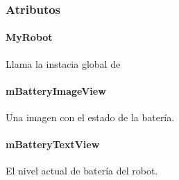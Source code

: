 \subsubsection{Atributos}
\label{\detokenize{dev_docs:id11}}

\paragraph{MyRobot}
\label{\detokenize{dev_docs:id12}}

\begin{fulllineitems}
\label{\detokenize{dev_docs:com.lar.cloudnao.RemoteControllerActivity.MyRobot}}
Llama la instacia global de {\hyperref[\detokenize{dev_docs:com.lar.cloudnao.Robot}]{}}

\end{fulllineitems}



\paragraph{mBatteryImageView}
\label{\detokenize{dev_docs:mbatteryimageview}}

\begin{fulllineitems}
\label{\detokenize{dev_docs:com.lar.cloudnao.RemoteControllerActivity.mBatteryImageView}}
Una imagen con el estado de la batería.

\end{fulllineitems}



\paragraph{mBatteryTextView}
\label{\detokenize{dev_docs:mbatterytextview}}

\begin{fulllineitems}
\label{\detokenize{dev_docs:com.lar.cloudnao.RemoteControllerActivity.mBatteryTextView}}
El nivel actual de batería del robot.

\end{fulllineitems}



